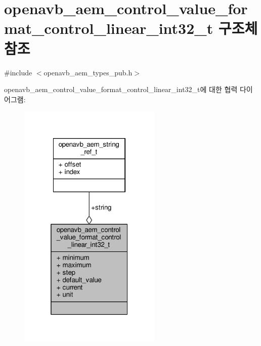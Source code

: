 \hypertarget{structopenavb__aem__control__value__format__control__linear__int32__t}{}\section{openavb\+\_\+aem\+\_\+control\+\_\+value\+\_\+format\+\_\+control\+\_\+linear\+\_\+int32\+\_\+t 구조체 참조}
\label{structopenavb__aem__control__value__format__control__linear__int32__t}


{\ttfamily \#include $<$openavb\+\_\+aem\+\_\+types\+\_\+pub.\+h$>$}



openavb\+\_\+aem\+\_\+control\+\_\+value\+\_\+format\+\_\+control\+\_\+linear\+\_\+int32\+\_\+t에 대한 협력 다이어그램\+:
\nopagebreak
\begin{figure}[H]
\begin{center}
\leavevmode
\includegraphics[width=193pt]{structopenavb__aem__control__value__format__control__linear__int32__t__coll__graph}
\end{center}
\end{figure}
